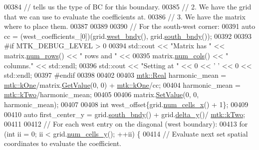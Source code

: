 \begin{DoxyCode}
00384   \textcolor{comment}{// tells us the type of BC for this boundary.}
00385   \textcolor{comment}{// 2. We have the grid that we can use to evaluate the coefficients at.}
00386   \textcolor{comment}{// 3. We have the matrix where to place them.}
00387 
00389 
00390   \textcolor{comment}{// For the south-west corner:}
00391   \textcolor{keyword}{auto} cc = (west\_coefficients\_[0])(grid.\hyperlink{classmtk_1_1UniStgGrid2D_af2b1712387ded85edaf2b64617d3fc13}{west\_bndy}(), grid.\hyperlink{classmtk_1_1UniStgGrid2D_a1442eaf219f099d0ebf46a170fdebf92}{south\_bndy}());
00392 
00393 \textcolor{preprocessor}{  #if MTK\_DEBUG\_LEVEL > 0}
00394   std::cout << \textcolor{stringliteral}{"Matrix has "} << matrix.\hyperlink{classmtk_1_1DenseMatrix_a53f3afb3b6a8d21854458aaa9663cc74}{num\_rows}() << \textcolor{stringliteral}{" rows and "} <<
00395     matrix.\hyperlink{classmtk_1_1DenseMatrix_a41747502d468c6728a4be31501b16e0e}{num\_cols}() << \textcolor{stringliteral}{" columns."} << std::endl;
00396   std::cout << \textcolor{stringliteral}{"Setting at "} << 0 << \textcolor{charliteral}{' '} << 0 << std::endl;
00397 \textcolor{preprocessor}{  #endif}
00398 
00402 
00403   \hyperlink{group__c01-roots_gac080bbbf5cbb5502c9f00405f894857d}{mtk::Real} harmonic\_mean = \hyperlink{group__c01-roots_ga26407c24d43b6b95480943340d285c71}{mtk::kOne}/matrix.\hyperlink{classmtk_1_1DenseMatrix_a4b23ecbebd970b5eea915dbb50691024}{GetValue}(0, 0) + 
      \hyperlink{group__c01-roots_ga26407c24d43b6b95480943340d285c71}{mtk::kOne}/cc;
00404   harmonic\_mean = \hyperlink{group__c01-roots_gaf39c2d851a2db744f4feb1c5ab3ec2cf}{mtk::kTwo}/harmonic\_mean;
00405 
00406   matrix.\hyperlink{classmtk_1_1DenseMatrix_a784ce5784109ac86bfb9d8562b334b13}{SetValue}(0, 0, harmonic\_mean);
00407 
00408   \textcolor{keywordtype}{int} west\_offset\{grid.\hyperlink{classmtk_1_1UniStgGrid2D_a2d182866a398aba8e4829590e85bf939}{num\_cells\_x}() + 1\};
00409 
00410   \textcolor{keyword}{auto} first\_center\_y = grid.\hyperlink{classmtk_1_1UniStgGrid2D_a1442eaf219f099d0ebf46a170fdebf92}{south\_bndy}() + grid.\hyperlink{classmtk_1_1UniStgGrid2D_a65a78cfc80ffdbeb282ed57af4dc5cb4}{delta\_y}()/
      \hyperlink{group__c01-roots_gaf39c2d851a2db744f4feb1c5ab3ec2cf}{mtk::kTwo};
00411 
00412   \textcolor{comment}{// For each west entry on the diagonal (west boundary):}
00413   \textcolor{keywordflow}{for} (\textcolor{keywordtype}{int} ii = 0; ii < grid.\hyperlink{classmtk_1_1UniStgGrid2D_aed05a801cc9a76dba0ff203cea58a61a}{num\_cells\_y}(); ++ii) \{
00414     \textcolor{comment}{// Evaluate next set spatial coordinates to evaluate the coefficient.}

\end{DoxyCode}
